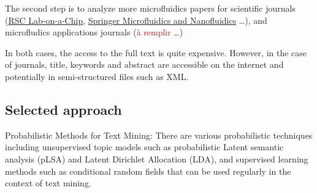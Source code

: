 The second step is to analyze more microfluidics papers for scientific journals (\ie  \href{https://www.rsc.org/journals-books-databases/about-journals/lab-on-a-chip/}{RSC Lab-on-a-Chip}, \href{https://link.springer.com/journal/10404}{Springer Microfluidics and Nanofluidics} \ldots), and microfludics applications journals (\ie\textcolor{red}{à remplir} \ldots)
\newline

In both cases,  the access to the full text is quite expensive. However, in the case of journals, title, keywords and abstract are accessible on the internet and potentially in semi-structured files such as XML.

\subsection{Selected approach}
Probabilistic Methods for Text Mining: 
There are various probabilistic techniques including unsupervised topic models such as probabilistic Latent semantic analysis (pLSA) and Latent Dirichlet Allocation (LDA), and supervised learning methods such as conditional random fields that can be used regularly in the context of text mining.
